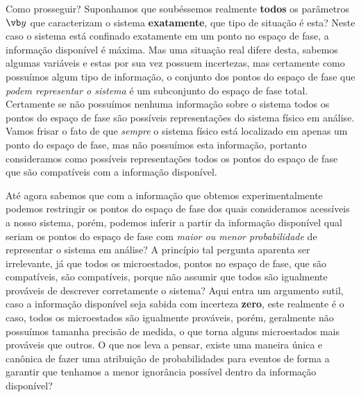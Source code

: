 \documentclass[twoside,reqno]{amsart}
\numberwithin{equation}{section}
\begin{document}
\begin{refsection}
Como prosseguir? Suponhamos que soubéssemos realmente \textbf{todos} os parâmetros $\vb y$ que caracterizam o sistema \textbf{exatamente}, que tipo de situação é esta? Neste caso o sistema está confinado exatamente em um ponto no espaço de fase, a informação disponível é máxima. Mas uma situação real difere desta, sabemos algumas variáveis e estas por sua vez possuem incertezas, mas certamente como possuímos algum tipo de informação, o conjunto dos pontos do espaço de fase que \emph{podem representar o sistema} é um subconjunto do espaço de fase total. Certamente se não possuímos nenhuma informação sobre o sistema todos os pontos do espaço de fase são possíveis representações do sistema físico em análise. Vamos frisar o fato de que \emph{sempre} o sistema físico está localizado em apenas um ponto do espaço de fase, mas não possuímos esta informação, portanto consideramos como possíveis representações todos os pontos do espaço de fase que são compatíveis com a informação disponível.

Até agora sabemos que com a informação que obtemos experimentalmente podemos restringir os pontos do espaço de fase dos quais consideramos acessíveis a nosso sistema, porém, podemos inferir a partir da informação disponível qual seriam os pontos do espaço de fase com \emph{maior ou menor probabilidade} de representar o sistema em análise? A princípio tal pergunta aparenta ser irrelevante, já que todos os microestados, pontos no espaço de fase, que são compatíveis, são compatíveis, porque não assumir que todos são igualmente prováveis de descrever corretamente o sistema? Aqui entra um argumento sutil, caso a informação disponível seja sabida com incerteza \textbf{zero}, este realmente é o caso, todos os microestados são igualmente prováveis, porém, geralmente não possuímos tamanha precisão de medida, o que torna alguns microestados mais prováveis que outros. O que nos leva a pensar, existe uma maneira única e canônica de fazer uma atribuição de probabilidades para eventos de forma a garantir que tenhamos a menor ignorância possível dentro da informação disponível?


\end{refsection}
\end{document}

